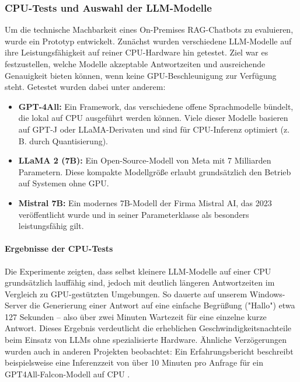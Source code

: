 \subsubsection{CPU-Tests und Auswahl der LLM-Modelle}

Um die technische Machbarkeit eines On-Premises RAG-Chatbots zu evaluieren, wurde ein Prototyp entwickelt.
Zunächst wurden verschiedene LLM-Modelle auf ihre Leistungsfähigkeit auf reiner CPU-Hardware hin getestet.
Ziel war es festzustellen, welche Modelle akzeptable Antwortzeiten und ausreichende Genauigkeit bieten können, wenn keine GPU-Beschleunigung zur Verfügung steht.
Getestet wurden dabei unter anderem:

\begin{itemize}
    \item \textbf{GPT-4All:} Ein Framework, das verschiedene offene Sprachmodelle bündelt, die lokal auf CPU ausgeführt werden können. Viele dieser Modelle basieren auf GPT-J oder LLaMA-Derivaten und sind für CPU-Inferenz optimiert (z. B. durch Quantisierung).
    \item \textbf{LLaMA 2 (7B):} Ein Open-Source-Modell von Meta mit 7 Milliarden Parametern. Diese kompakte Modellgröße erlaubt grundsätzlich den Betrieb auf Systemen ohne GPU.
    \item \textbf{Mistral 7B:} Ein modernes 7B-Modell der Firma Mistral AI, das 2023 veröffentlicht wurde und in seiner Parameterklasse als besonders leistungsfähig gilt.
\end{itemize}

\paragraph{Ergebnisse der CPU-Tests}

Die Experimente zeigten, dass selbst kleinere LLM-Modelle auf einer CPU grundsätzlich lauffähig sind, jedoch mit deutlich längeren Antwortzeiten im Vergleich zu GPU-gestützten Umgebungen.
So dauerte auf unserem Windows-Server die Generierung einer Antwort auf eine einfache Begrüßung ("Hallo") etwa 127 Sekunden – also über zwei Minuten Wartezeit für eine einzelne kurze Antwort.
Dieses Ergebnis verdeutlicht die erheblichen Geschwindigkeitsnachteile beim Einsatz von LLMs ohne spezialisierte Hardware.
Ähnliche Verzögerungen wurden auch in anderen Projekten beobachtet: Ein Erfahrungsbericht beschreibt beispielsweise eine Inferenzzeit von über 10 Minuten pro Anfrage für ein GPT4All-Falcon-Modell auf CPU \cite{cpu_reasoning_langchain}.

